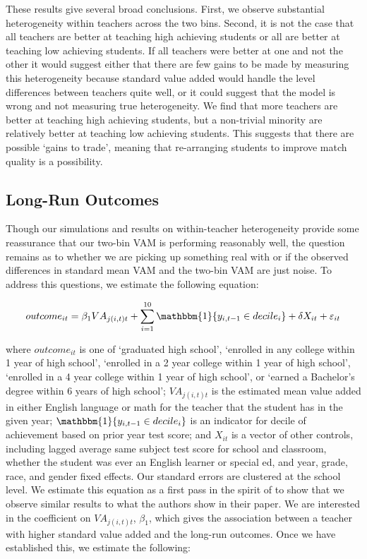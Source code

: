 \documentclass[letterpaper,12pt]{article}
\begin{document}
These results give several broad conclusions. First, we observe substantial heterogeneity within teachers across the two bins. Second, it is not the case that all teachers are better at teaching high achieving students or all are better at teaching low achieving students. If all teachers were better at one and not the other it would suggest either that there are few gains to be made by measuring this heterogeneity because standard value added would handle the level differences between teachers quite well, or it could suggest that the model is wrong and not measuring true heterogeneity. We find that more teachers are better at teaching high achieving students, but a non-trivial minority are relatively better at teaching low achieving students. This suggests that there are possible `gains to trade', meaning that re-arranging students to improve match quality is a possibility.




\subsection{Long-Run Outcomes}

Though our simulations and results on within-teacher heterogeneity provide some reassurance that our two-bin VAM is performing reasonably well, the question remains as to whether we are picking up something real with or if the observed differences in standard mean VAM and the two-bin VAM are just noise. To address this questions, we estimate the following equation:

    \begin{equation}\label{eq: standard long run}
        outcome_{it} = \beta_1 VA_{j(i,t)t} + \sum_{i=1}^{10} \mathbbm{1}\{y_{i,t-1} \in decile_i\} + \delta X_{it} + \varepsilon_{it}
    \end{equation}
    
\noindent where $outcome_{it}$ is one of `graduated high school', `enrolled in any college within 1 year of high school', `enrolled in a 2 year college within 1 year of high school', `enrolled in a 4 year college within 1 year of high school', or `earned a Bachelor's degree within 6 years of high school'; $VA_{j(i,t)t}$ is the estimated mean value added in either English language or math for the teacher that the student has in the given year; $\mathbbm{1}\{y_{i,t-1} \in decile_i\}$ is an indicator for decile of achievement based on prior year test score; and $X_{it}$ is a vector of other controls, including lagged average same subject test score for school and classroom, whether the student was ever an English learner or special ed, and year, grade, race, and gender fixed effects. Our standard errors are clustered at the school level. We estimate this equation as a first pass in the spirit of \cite{chetty2014measuring2} to show that we observe similar results to what the authors show in their paper. We are interested in the coefficient on $VA_{j(i,t)t}$, $\beta_1$, which gives the association between a teacher with higher standard value added and the long-run outcomes. Once we have established this, we estimate the following:
\end{document}
